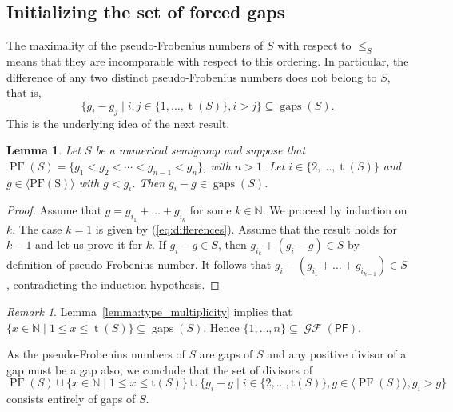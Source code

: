 \documentclass[11pt]{amsart}
\newtheorem{lemma}[theorem]{Lemma}
\theoremstyle{remark}
\newtheorem{remark}[theorem]{Remark}
\begin{document}
\subsection{Initializing the set of forced gaps}
\label{subsec:starting_forced_gaps}
The maximality of the pseudo-Frobenius numbers of $S$ with respect to $\le_S$ means that they are incomparable with respect to this ordering. In particular, the difference of any two distinct pseudo-Frobenius numbers does not belong to $S$, that is, 
\begin{equation}\label{eq:differences}
\{g_i-g_j\mid i,j\in \{1,\ldots,\operatorname{t}(S)\}, i> j\} \subseteq \operatorname{gaps}(S).
\end{equation}
This is the underlying idea of the next result. 
\begin{lemma}\label{lemma:pseudo-comb-pseudo}
Let $S$ be a numerical semigroup and suppose that $\operatorname{PF}(S)=\{g_1<g_2<\cdots <g_{n-1}<g_n\}$, with $n>1$.
Let $i\in\{2,\ldots,\operatorname{t}(S)\}$ and $g\in\langle \mathrm{PF(S)}\rangle$ with $g<g_i$. Then $g_i-g\in \operatorname{gaps}(S)$.
\end{lemma}
\begin{proof}
Assume that $g=g_{i_1}+\dots+g_{i_k}$ for some $k\in \mathbb N$. We proceed by induction on $k$. 
The case $k=1$ is given by (\ref{eq:differences}).
Assume that the result holds for $k-1$ and let us prove it for $k$. If $g_i-g\in S$, then $g_{i_k}+(g_i-g)\in S$ by definition of pseudo-Frobenius number. It follows that $g_i-(g_{i_1}+\dots+g_{i_{k-1}})\in S$, contradicting the induction hypothesis.
\end{proof}
\begin{remark}\label{rem:type_multiplicity}
Lemma~\ref{lemma:type_multiplicity} implies that $\{x\in\mathbb{N}\mid 1\le x\le \operatorname{t}(S)\}\subseteq \operatorname{gaps}(S)$. Hence $\{1,\ldots, n\}\subseteq \operatorname{\mathcal{GF}}({\ensuremath{\mathsf{PF}}})$.
\end{remark}
As the pseudo-Frobenius numbers of $S$ are gaps of $S$ and any positive divisor of a gap must be a gap also, we conclude that the set of divisors of
$$\operatorname{PF}(S)\cup\{x\in\mathbb{N}\mid 1\le x\le \mathrm{t}(S)\}\cup\{g_i-g\mid i\in \{2,\ldots,\mathrm{t}(S)\}, g\in\langle \operatorname{PF}(S)\rangle, g_i>g\}$$
consists entirely of gaps of $S$.
\end{document}
